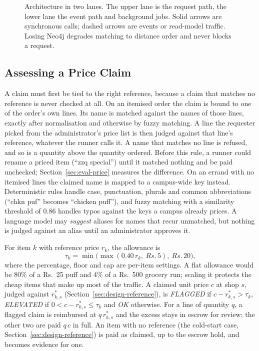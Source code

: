 \documentclass[journal]{IEEEtran}
\newcommand{\Rs}{Rs.\,}
\begin{document}
\begin{figure}[!t]
\centering

\caption{Architecture in two lanes. The upper lane is the request path, the lower
lane the event path and background jobs. Solid arrows are synchronous calls; dashed
arrows are events or read-model traffic. Losing Neo4j degrades matching to distance
order and never blocks a request.}
\label{fig:arch}
\end{figure}

\subsection{Assessing a Price Claim}\label{sec:design-claims}
A claim must first be tied to the right reference, because a claim that matches no
reference is never checked at all. On an itemised order the claim is bound to one of
the order's own lines. Its name is matched against the names of those lines, exactly
after normalisation and otherwise by fuzzy matching. A line the requester picked from
the administrator's price list is then judged against that line's reference, whatever
the runner calls it. A name that matches no line is refused, and so is a quantity
above the quantity ordered. Before this rule, a runner could rename a priced item
(``zzq special'') until it matched nothing and be paid unchecked; Section~\ref{sec:eval-price}
measures the difference. On an errand with no itemised lines the claimed name is
mapped to a campus-wide key instead. Deterministic rules handle case, punctuation,
plurals and common abbreviations (``chkn puf'' becomes ``chicken puff''), and fuzzy
matching with a similarity threshold of 0.86 handles typos against the keys a campus
already prices. A language model may \emph{suggest} aliases for names that recur
unmatched, but nothing is judged against an alias until an administrator approves
it.

For item $k$ with reference price $r_k$, the allowance is
\begin{equation}
\tau_k = \min\bigl(\max(0.40\,r_k,\ \Rs 5),\ \Rs 20\bigr), \label{eq:tolerance}
\end{equation}
where the percentage, floor and cap are per-item settings. A flat allowance would
be 80\% of a Rs.~25 puff and 4\% of a Rs.~500 grocery run; scaling it protects the
cheap items that make up most of the traffic. A claimed unit price $c$ at shop $s$,
judged against $r^*_{k,s}$ (Section~\ref{sec:design-reference}), is
\emph{FLAGGED} if $c-r^*_{k,s}>\tau_k$, \emph{ELEVATED} if $0<c-r^*_{k,s}\le\tau_k$
and \emph{OK} otherwise. For a line of quantity $q$, a flagged claim is reimbursed at
$q\,r^*_{k,s}$ and the excess stays in escrow for review; the other two are paid
$q\,c$ in full. An item with no reference (the cold-start
case, Section~\ref{sec:design-reference}) is paid as claimed, up to the escrow hold,
and becomes evidence for one.
\end{document}
